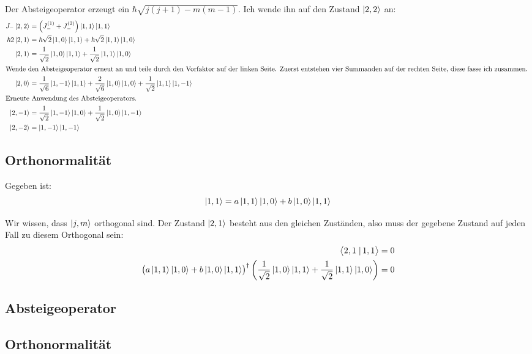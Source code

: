 Der Absteigeoperator erzeugt ein $\hbar \sqrt{j(j+1) - m(m-1)}$. Ich wende ihn auf den Zustand $\left| 2, 2 \right\rangle$ an:
\begin{align*}
	J_- \ket{2, 2}
	&= \del{J_-^{(1)} + J_-^{(2)}} \ket{1, 1} \ket{1, 1} \\
	\hbar 2 \ket{2, 1}
	&= \hbar \sqrt 2 \ket{1, 0} \ket{1, 1} + \hbar \sqrt 2 \ket{1, 1} \ket{1, 0} \\
	\ket{2, 1}
	&= \frac1{\sqrt 2} \ket{1, 0} \ket{1, 1} + \frac1{\sqrt 2} \ket{1, 1} \ket{1, 0} \\
	\intertext{%
		Wende den Absteigeoperator erneut an und teile durch den Vorfaktor auf
		der linken Seite. Zuerst entstehen vier Summanden auf der rechten
		Seite, diese fasse ich zusammen.
	}
	\ket{2, 0}
	&= \frac1{\sqrt 6} \ket{1, -1} \ket{1, 1} + \frac2{\sqrt 6} \ket{1, 0} \ket{1, 0} + \frac1{\sqrt 2} \ket{1, 1} \ket{1, -1} \\
	\intertext{%
		Erneute Anwendung des Absteigeoperators.
	}
	\ket{2, -1}
	&= \frac1{\sqrt 2} \ket{1, -1} \ket{1, 0} + \frac1{\sqrt 2} \ket{1, 0} \ket{1, -1} \\
	\ket{2, -2}
	&= \ket{1, -1} \ket{1, -1}
\end{align*}

\subsection{Orthonormalität}

Gegeben ist:
\[
	\left| 1, 1 \right\rangle = a \left| 1, 1 \right\rangle \left| 1, 0 \right\rangle + b \left| 1, 0 \right\rangle \left| 1, 1 \right\rangle
\]

Wir wissen, dass $\left| j, m \right\rangle$ orthogonal sind. Der Zustand $\left| 2, 1 \right\rangle$ besteht
aus den gleichen Zuständen, also muss der gegebene Zustand auf jeden Fall zu
diesem Orthogonal sein:
\begin{align*}
	\braket{2, 1}{1, 1} &= 0 \\
	\del{a \ket{1, 1} \ket{1, 0} + b \ket{1, 0} \ket{1, 1}}^\dagger \del{\frac1{\sqrt 2} \ket{1, 0} \ket{1, 1} + \frac1{\sqrt 2} \ket{1, 1} \ket{1, 0}} &= 0 \\
\end{align*}

\subsection{Absteigeoperator}

\subsection{Orthonormalität}


\IfFileExists{\bibliographyfile}{
}{}



